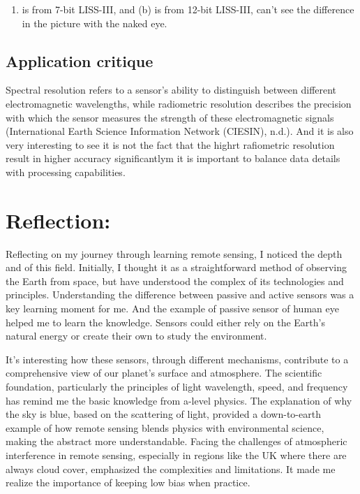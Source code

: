 \documentclass[
  letterpaper,
  DIV=11,
  numbers=noendperiod]{scrreprt}
\providecommand{\tightlist}{%
  \setlength{\itemsep}{0pt}\setlength{\parskip}{0pt}}\usepackage{longtable,booktabs,array}
\begin{document}
\begin{enumerate}
\def\labelenumi{(\alph{enumi})}
\tightlist
\item
  is from 7-bit LISS-III, and (b) is from 12-bit LISS-III, can't see the
  difference in the picture with the naked eye.
\end{enumerate}

\subsection{Application critique}\label{application-critique}

Spectral resolution refers to a sensor's ability to distinguish between
different electromagnetic wavelengths, while radiometric resolution
describes the precision with which the sensor measures the strength of
these electromagnetic signals (International Earth Science Information
Network (CIESIN), n.d.). And it is also very interesting to see it is
not the fact that the highrt rafiometric resolution result in higher
accuracy significantlym it is important to balance data details with
processing capabilities.

\section{Reflection:}\label{reflection}

Reflecting on my journey through learning remote sensing, I noticed the
depth and of this field. Initially, I thought it as a straightforward
method of observing the Earth from space, but have understood the
complex of its technologies and principles. Understanding the difference
between passive and active sensors was a key learning moment for me. And
the example of passive sensor of human eye helped me to learn the
knowledge. Sensors could either rely on the Earth's natural energy or
create their own to study the environment.

It's interesting how these sensors, through different mechanisms,
contribute to a comprehensive view of our planet's surface and
atmosphere. The scientific foundation, particularly the principles of
light wavelength, speed, and frequency has remind me the basic knowledge
from a-level physics. The explanation of why the sky is blue, based on
the scattering of light, provided a down-to-earth example of how remote
sensing blends physics with environmental science, making the abstract
more understandable. Facing the challenges of atmospheric interference
in remote sensing, especially in regions like the UK where there are
always cloud cover, emphasized the complexities and limitations. It made
me realize the importance of keeping low bias when practice.
\end{document}
